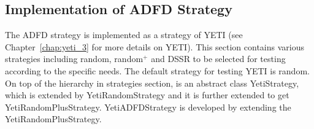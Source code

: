 








\subsection{Implementation of ADFD Strategy}\label{sec:implementation}
The ADFD strategy is implemented as a strategy of YETI (see Chapter~\ref{chap:yeti_3} for more details on YETI). This section contains various strategies including random, random$^+$ and DSSR to be selected for testing according to the specific needs. The default strategy for testing YETI is random. On top of the hierarchy in strategies section, is an abstract class YetiStrategy, which is extended by YetiRandomStrategy and it is further extended to get YetiRandomPlusStrategy. YetiADFDStrategy is developed by extending the YetiRandomPlusStrategy.

